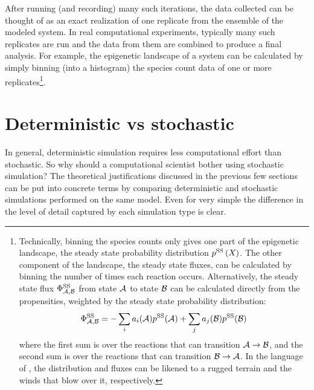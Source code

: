 After running (and recording) many such iterations, the data collected can be thought of as an exact realization of one replicate from the ensemble of the modeled system. In real computational experiments, typically many such replicates are run and the data from them are combined to produce a final analysis. For example, the epigenetic landscape of a system can be calculated by simply binning (\ie into a histogram) the species count data of one or more replicates\footnote{Technically, binning the species counts only gives one part of the epigenetic landscape, the steady state probability distribution $p^{\textrm{SS}}_{} \left( X_{} \right)$. The other component of the landscape, the steady state fluxes, can be calculated by binning the number of times each reaction occurs. Alternatively, the steady state flux $\Phi^{\textrm{SS}}_{\mathcal{A}, \mathcal{B}}$ from state $\mathcal{A}$ to state $\mathcal{B}$ can be calculated directly from the propensities, weighted by the steady state probability distribution:
\begin{equation*}
    \Phi^{\textrm{SS}}_{\mathcal{A}, \mathcal{B}} = - \sum_{i} a_{i} ( \mathcal{A} ) p^{\textrm{SS}}_{} ( \mathcal{A} ) + \sum_{j} a_{j} ( \mathcal{B} ) p^{\textrm{SS}}_{} ( \mathcal{B} )
\end{equation*}
where the first sum is over the reactions that can transition $\mathcal{A} \rightarrow \mathcal{B}$, and the second sum is over the reactions that can transition $\mathcal{B} \rightarrow \mathcal{A}$. In the language of , the distribution and fluxes can be likened to a rugged terrain and the winds that blow over it, respectively.}.


\section{Deterministic vs stochastic}\label{sec:deterministic_vs_stochastic}

In general, deterministic simulation requires less computational effort than stochastic. So why should a computational scientist bother using stochastic simulation? The theoretical justifications discussed in the previous few sections can be put into concrete terms by comparing deterministic and stochastic simulations performed on the same model. Even for very simple  the difference in the level of detail captured by each simulation type is clear.

